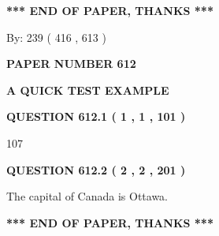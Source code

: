 \documentclass[12pt]{article}
\begin{document}
 
   
   
 \vspace{0.2in}
 
   
   
   
   
\vspace{1.0in} 
{\textbf{\large{ *** END OF PAPER, THANKS *** }}} 
   
   
\hspace{1.0in} By: 
 239 ( 416 ,  613 )
   
   
   
   
\newpage 
\setcounter{page}{ 
   612001 } 
   
   
   
   
 {\textbf{ \Large{ PAPER NUMBER  612  }}}
   
   
\vspace{0.2in}
   
   
   
   
   
   
 \vspace{0.2in}
{\LARGE {\textbf{ A QUICK TEST EXAMPLE}}}
   
   
  
\vspace{0.2in}
  
{\textbf{\Large{QUESTION
612.1 
 ( 1 , 1 , 101 )
}}}
  
  
 
 
\noindent{}

107
 
 
  
\vspace{0.2in}
  
{\textbf{\Large{QUESTION
612.2 
 ( 2 , 2 , 201 )
}}}
  
  
 
 
\noindent{}
 
 
The capital of Canada is Ottawa.
 
 
 
 
   
   
 \vspace{0.2in}
 
   
   
   
   
\vspace{1.0in} 
{\textbf{\large{ *** END OF PAPER, THANKS *** }}} 
   
\end{document}
